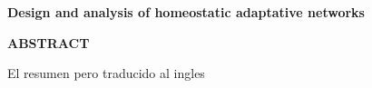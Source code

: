 \begin{center}
{\Large \bfseries Design and analysis of homeostatic adaptative networks}

\vspace{1cm}
{\Large \bfseries ABSTRACT}

\vspace{2.5cm}
\end{center}


El resumen pero traducido al ingles
